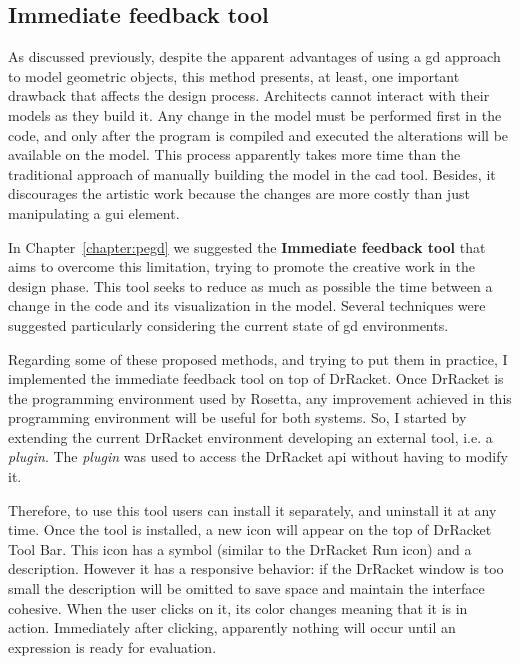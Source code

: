 \subsection{Immediate feedback tool}

As discussed previously, despite the apparent advantages of using a \gls{gd} approach to model geometric objects, this method presents, at least, one important drawback that affects the design process. Architects cannot interact with their models as they build it. Any change in the model must be performed first in the code, and only after the program is compiled and executed the alterations will be available on the model. This process apparently takes more time than the traditional approach of manually building the model in the \gls{cad} tool. Besides, it discourages the artistic work because the changes are more costly than just manipulating a \gls{gui} element.

In Chapter~\ref{chapter:pegd} we suggested the \textbf{Immediate feedback tool} that aims to overcome this limitation, trying to promote the creative work in the design phase. This tool seeks to reduce as much as possible the time between a change in the code and its visualization in the model. Several techniques were suggested particularly considering the current state of \gls{gd} environments.

Regarding some of these proposed methods, and trying to put them in practice, I implemented the immediate feedback tool on top of DrRacket. Once DrRacket is the programming environment used by Rosetta, any improvement achieved in this programming environment will be useful for both systems. So, I started by extending the current DrRacket environment developing an external tool, i.e. a \textit{\textit{plugin}}. The \textit{\textit{plugin}} was used to access the DrRacket \gls{api} without having to modify it.

Therefore, to use this tool users can install it separately, and uninstall it at any time. Once the tool is installed, a new icon will appear on the top of DrRacket Tool Bar. This icon has a symbol (similar to the DrRacket Run icon) and a description. However it has a responsive behavior: if the DrRacket window is too small the description will be omitted to save space and maintain the interface cohesive. When the user clicks on it, its color changes meaning that it is in action. Immediately after clicking, apparently nothing will occur until an expression is ready for evaluation.

